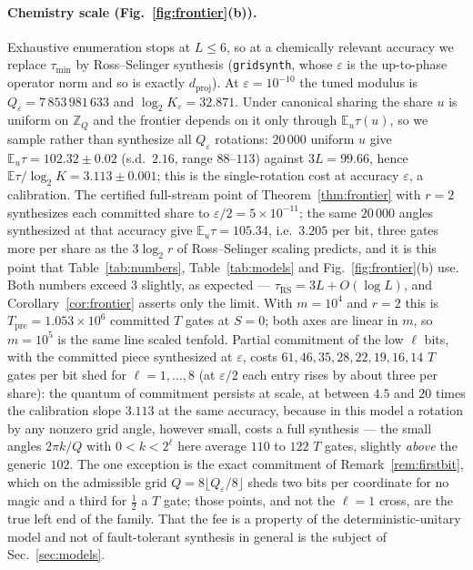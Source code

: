 \documentclass[aps,prx,twocolumn,superscriptaddress,nofootinbib,longbibliography]{revtex4-2}
\theoremstyle{plain}
\theoremstyle{definition}
\theoremstyle{remark}
\newcommand{\dproj}{d_{\mathrm{proj}}}
\newcommand{\Tpre}{T_{\mathrm{pre}}}
\newcommand{\E}{\mathbb{E}}
\newcommand{\Z}{\mathbb{Z}}
\begin{document}
\paragraph{Chemistry scale (Fig.~\ref{fig:frontier}(b)).} Exhaustive enumeration stops at $L\le6$, so at a chemically relevant accuracy we replace $\tau_{\min}$ by Ross--Selinger synthesis (\texttt{gridsynth}, whose $\varepsilon$ is the up-to-phase operator norm and so is exactly $\dproj$). At $\varepsilon=10^{-10}$ the tuned modulus is $Q_\varepsilon=7\,853\,981\,633$ and $\log_2K_\varepsilon=32.871$. Under canonical sharing the share $u$ is uniform on $\Z_Q$ and the frontier depends on it only through $\E_u\tau(u)$, so we sample rather than synthesize all $Q_\varepsilon$ rotations: $20\,000$ uniform $u$ give $\E_u\tau=102.32\pm0.02$ (s.d.\ $2.16$, range $88$--$113$) against $3L=99.66$, hence $\E\tau/\log_2K=3.113\pm0.001$; this is the single-rotation cost at accuracy $\varepsilon$, a calibration. The certified full-stream point of Theorem~\ref{thm:frontier} with $r=2$ synthesizes each committed share to $\varepsilon/2=5\times10^{-11}$; the same $20\,000$ angles synthesized at that accuracy give $\E_u\tau=105.34$, i.e.\ $3.205$ per bit, three gates more per share as the $3\log_2r$ of Ross--Selinger scaling predicts, and it is this point that Table~\ref{tab:numbers}, Table~\ref{tab:models} and Fig.~\ref{fig:frontier}(b) use. Both numbers exceed $3$ slightly, as expected --- $\tau_{\mathrm{RS}}=3L+O(\log L)$, and Corollary~\ref{cor:frontier} asserts only the limit. With $m=10^4$ and $r=2$ this is $\Tpre=1.053\times10^6$ committed $T$ gates at $S=0$; both axes are linear in $m$, so $m=10^5$ is the same line scaled tenfold. Partial commitment of the low $\ell$ bits, with the committed piece synthesized at $\varepsilon$, costs $61,46,35,28,22,19,16,14$ $T$ gates per bit shed for $\ell=1,\dots,8$ (at $\varepsilon/2$ each entry rises by about three per share): the quantum of commitment persists at scale, at between $4.5$ and $20$ times the calibration slope $3.113$ at the same accuracy, because in this model a rotation by any nonzero grid angle, however small, costs a full synthesis --- the small angles $2\pi k/Q$ with $0<k<2^\ell$ here average $110$ to $122$ $T$ gates, slightly \emph{above} the generic $102$. The one exception is the exact commitment of Remark~\ref{rem:firstbit}, which on the admissible grid $Q=8\lfloor Q_\varepsilon/8\rfloor$ sheds two bits per coordinate for no magic and a third for $\tfrac12$ a $T$ gate; those points, and not the $\ell=1$ cross, are the true left end of the family. That the fee is a property of the deterministic-unitary model and not of fault-tolerant synthesis in general is the subject of Sec.~\ref{sec:models}.
\end{document}
